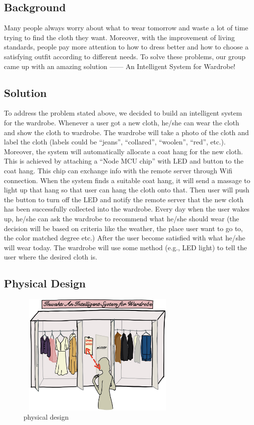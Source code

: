 \subsection{Background}  
Many people always worry about what to wear tomorrow and waste a lot of time trying to find the cloth they want. Moreover, with the improvement of living standards, people pay more attention to how to dress better and how to choose a satisfying outfit according to different needs. To solve these problems, our group came up with an amazing solution —— An Intelligent System for Wardrobe! 

\subsection{Solution}
To address the problem stated above, we decided to build an intelligent system for the wardrobe. Whenever a user got a new cloth, he/she can wear the cloth and show the cloth to wardrobe. The wardrobe will take a photo of the cloth and label the cloth (labels could be “jeans”, “collared”, “woolen”, “red”, etc.). Moreover, the system will automatically allocate a coat hang for the new cloth. This is achieved by attaching a “Node MCU chip” with LED and button to the coat hang. This chip can exchange info with the remote server through Wifi connection. When the system finds a suitable coat hang, it will send a massage to light up that hang so that user can hang the cloth onto that. Then user will push the button to turn off the LED and notify the remote server that the new cloth has been successfully collected into the wardrobe. Every day when the user wakes up, he/she can ask the wardrobe to recommend what he/she should wear (the decision will be based on criteria like the weather, the place user want to go to, the color matched degree etc.) After the user become satisfied with what he/she will wear today. The wardrobe will use some method (e.g., LED light) to tell the user where the desired cloth is.

\subsection{Physical Design}

\begin{figure}[h]
   \centering
   \includegraphics[width=8cm,height=6cm]{graph/physical design.jpg}
   \caption{physical design}
   \end{figure}

